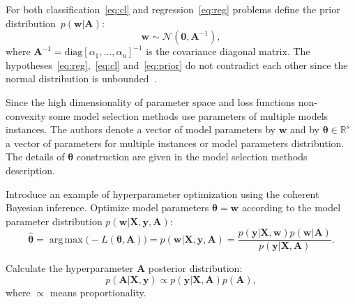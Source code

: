 \documentclass[smallcondensed]{svjour3}
\DeclareMathOperator*{\argmax}{arg\,max}
\begin{document}
For both classification~\eqref{eq:cl} and regression~\eqref{eq:reg} problems define the prior distribution~$p(\mathbf{w}|\mathbf{A})$:
\begin{equation}
\label{eq:prior}
	\mathbf{w} \sim \mathcal{N}(\mathbf{0}, \mathbf{A}^{-1}),
\end{equation}
where  $\mathbf{A}^{-1} = \text{diag}[\alpha_1, \dots, \alpha_u]^{-1}$ is the covariance  diagonal matrix. The hypotheses~\eqref{eq:reg},~\eqref{eq:cl} and~\eqref{eq:prior} 	do	not	contradict	each other since the normal distribution is unbounded~\cite{bayes_constr}.  


Since the high dimensionality  of parameter space and loss functions non-convexity some model selection methods use parameters of multiple models instances. The authors denote  a vector of model parameters by $\mathbf{w}$ and by $\boldsymbol{\theta} \in \mathbb{R}^s$ a vector of parameters for multiple instances or model parameters distribution. The details of $\boldsymbol{\theta}$ construction are given in the model selection methods description.

Introduce an example of hyperparameter optimization using the coherent Bayesian inference. Optimize model parameters $\boldsymbol{\theta} = \mathbf{w}$ according to the model parameter distribution $p(\mathbf{w}|\mathbf{X}, \mathbf{y}, \mathbf{A})$:
\begin{equation}
\label{eq:bayes1}
\hat{\boldsymbol{\theta}} = \argmax \bigl(-L(\boldsymbol{\theta}, \mathbf{A})\bigr) = p(\mathbf{w}|\mathbf{X}, \mathbf{y}, \mathbf{A}) = \frac{p(\mathbf{y}|\mathbf{X},\mathbf{w})p(\mathbf{w}|\mathbf{A})}{p(\mathbf{y}|\mathbf{X},\mathbf{A})}.
\end{equation}

Calculate the hyperparameter  $\mathbf{A}$ posterior distribution:
\[
p(\mathbf{A}|\mathbf{X}, \mathbf{y}) \propto p(\mathbf{y}|\mathbf{X},\mathbf{A})p(\mathbf{A}),
\]
where $\propto$ means proportionality.
\end{document}
